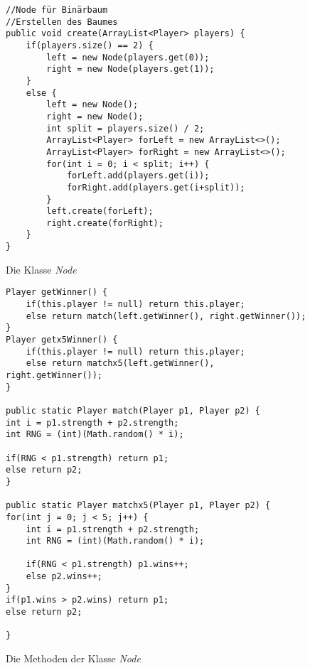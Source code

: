 \documentclass[a4paper, 12pt]{scrartcl}
\begin{document}
\begin{figure}[H]
\centering
\begin{lstlisting}
//Node für Binärbaum
//Erstellen des Baumes
public void create(ArrayList<Player> players) {
    if(players.size() == 2) {
        left = new Node(players.get(0));
        right = new Node(players.get(1));
    }
    else {
        left = new Node();
        right = new Node();
        int split = players.size() / 2;
        ArrayList<Player> forLeft = new ArrayList<>();
        ArrayList<Player> forRight = new ArrayList<>();
        for(int i = 0; i < split; i++) {
            forLeft.add(players.get(i));
            forRight.add(players.get(i+split));
        }
        left.create(forLeft);
        right.create(forRight);
    }
}
\end{lstlisting}
\caption{Die Klasse \emph{Node}}
\end{figure}

\begin{figure}[H]
\centering
\begin{lstlisting}
Player getWinner() {
    if(this.player != null) return this.player;
    else return match(left.getWinner(), right.getWinner());
}
Player getx5Winner() {
    if(this.player != null) return this.player;
    else return matchx5(left.getWinner(), right.getWinner());
}

public static Player match(Player p1, Player p2) {
int i = p1.strength + p2.strength;
int RNG = (int)(Math.random() * i);

if(RNG < p1.strength) return p1;
else return p2;
}

public static Player matchx5(Player p1, Player p2) {
for(int j = 0; j < 5; j++) {
    int i = p1.strength + p2.strength;
    int RNG = (int)(Math.random() * i);
    
    if(RNG < p1.strength) p1.wins++;
    else p2.wins++;
}
if(p1.wins > p2.wins) return p1;
else return p2;

}
\end{lstlisting}
\caption{Die Methoden der Klasse \emph{Node}}
\end{figure}
\end{document}
